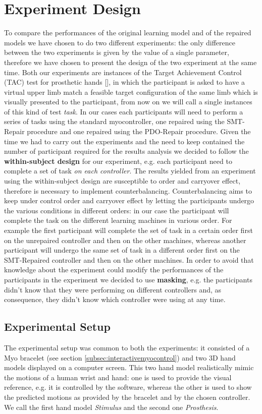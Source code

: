 \section{Experiment Design}\label{sec:exp-design}
To compare the performances of the original learning model and of the repaired models we have chosen to do two different experiments: the only difference between the two experiments is given by the value of a single parameter, therefore we have chosen to present the design of the two experiment at the same time.
Both our experiments are instances of the Target Achievement Control (TAC) test for prosthetic hands [\cite{simon2011target}], in which the participant is asked to have a virtual upper limb match a feasible target configuration of the same limb which is visually presented to the participant, from now on we will call a single instances of this kind of test \textit{task}.
In our cases each participants will need to perform a series of tasks using the standard myocontroller, one repaired using the SMT-Repair procedure and one repaired using the PDO-Repair procedure.
Given the time we had to carry out the experiments and the need to keep contained the number of participant required for the results analysis we decided to follow the \textbf{within-subject design} for our experiment, e.g. each participant need to complete a set of task \textit{on each controller}. The results yielded from an experiment using the within-subject design are susceptible to order and carryover effect, therefore is necessary to implement counterbalancing. Counterbalancing aims to keep under control order and carryover effect by letting the participants undergo the various conditions in different orders: in our case the participant will complete the task on the different learning machines in various order. For example the first participant will complete the set of task in a certain order first on the unrepaired controller and then on the other machines, whereas another participant will undergo the same set of task in a different order first on the SMT-Repaired controller and then on the other machines.
In order to avoid that knowledge about the experiment could modify the performances of the participants in the experiment we decided to use \textbf{masking}, e.g. the participants didn't know that they were performing on different controllers and, as consequence, they didn't know which controller were using at any time.
\subsection{Experimental Setup}\label{subsec:exp-setup}
The experimental setup was common to both the experiments: it consisted of a Myo bracelet (see section \ref{subsec:interactivemyocontrol}) and two 3D hand models displayed on a computer screen. This two hand model realistically mimic the motions of a human wrist and hand: one is used to provide the visual reference, e.g. it is controlled by the software, whereas the other is used to show the predicted motions as provided by the bracelet and by the chosen controller. We call the first hand model \textit{Stimulus} and the second one \textit{Prosthesis}.
